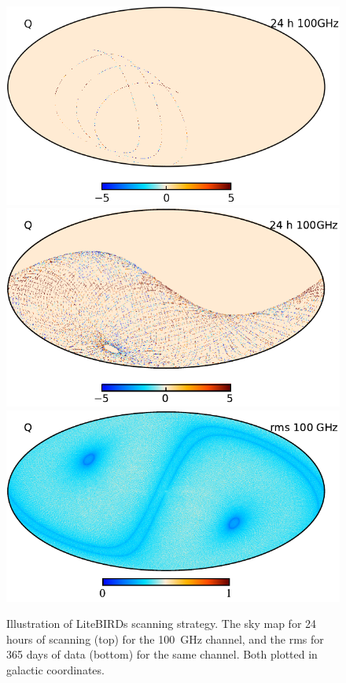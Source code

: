 \documentclass[twocolumn]{aa}
\begin{document}
\begin{figure}[t]
  \center
  \includegraphics[width=\linewidth]{figs/tod_100a_map_c0001_k000001_Q_Stokes_w12_n512_cb_c-planck-1h.png} %
  \includegraphics[width=\linewidth]{figs/tod_100a_map_c0001_k000001_Q_Stokes_w12_n512_cb_c-planck-24h.pdf}
  \includegraphics[width=\linewidth]{figs/tod_100a_rms_c0001_k000086_Q_Stokes_w12_n512_cb_c-planck}
  \caption{Illustration of LiteBIRDs scanning strategy. The sky map for 24 hours of scanning (top) for the 100~GHz channel, and the rms for 365 days of data (bottom) for the same channel. Both plotted in galactic coordinates.}
  \label{fig:scanning_strategy}  
\end{figure}
\end{document}
